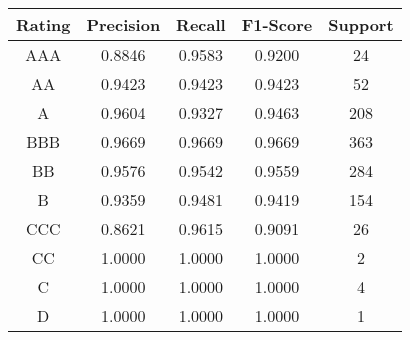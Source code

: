 \footnotesize
\begin{tabular}{ccccc}
\toprule
Rating & Precision & Recall & F1-Score & Support \\
\midrule
AAA & 0.8846 & 0.9583 & 0.9200 & 24 \\
AA & 0.9423 & 0.9423 & 0.9423 & 52 \\
A & 0.9604 & 0.9327 & 0.9463 & 208 \\
BBB & 0.9669 & 0.9669 & 0.9669 & 363 \\
BB & 0.9576 & 0.9542 & 0.9559 & 284 \\
B & 0.9359 & 0.9481 & 0.9419 & 154 \\
CCC & 0.8621 & 0.9615 & 0.9091 & 26 \\
CC & 1.0000 & 1.0000 & 1.0000 & 2 \\
C & 1.0000 & 1.0000 & 1.0000 & 4 \\
D & 1.0000 & 1.0000 & 1.0000 & 1 \\
\bottomrule
\end{tabular}

\normalsize
